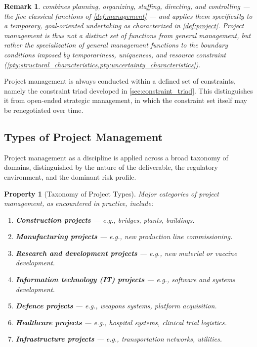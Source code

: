 \documentclass[12pt, a4paper]{report}
\theoremstyle{engnotes}
\newtheorem{property}{Property}[section]
\newtheorem{remark}{Remark}[section]
\begin{document}
\begin{remark}
     combines planning, organizing, staffing, directing, and controlling --- the five classical functions of \cref{def:management} --- and applies them specifically to a temporary, goal-oriented undertaking as characterized in \cref{def:project}. Project management is thus \emph{not} a distinct set of functions from general management, but rather the specialization of general management functions to the boundary conditions imposed by temporariness, uniqueness, and resource constraint (\cref{pty:structural_characteristics,pty:uncertainty_characteristics}).
\end{remark}

\begin{note}
    Project management is always conducted within a defined set of constraints, namely the constraint triad developed in \cref{sec:constraint_triad}. This distinguishes it from open-ended strategic management, in which the constraint set itself may be renegotiated over time.
\end{note}

\subsection{Types of Project Management}
\label{subsec:types_pm}

Project management as a discipline is applied across a broad taxonomy of domains, distinguished by the nature of the deliverable, the regulatory environment, and the dominant risk profile.

\begin{property}[Taxonomy of Project Types]\label{pty:taxonomy_project_types}
    Major categories of project management, as encountered in practice, include:
    \begin{enumerate}
        \item \textbf{Construction projects} --- e.g., bridges, plants, buildings.
        \item \textbf{Manufacturing projects} --- e.g., new production line commissioning.
        \item \textbf{Research and development projects} --- e.g., new material or vaccine development.
        \item \textbf{Information technology (IT) projects} --- e.g., software and systems development.
        \item \textbf{Defence projects} --- e.g., weapons systems, platform acquisition.
        \item \textbf{Healthcare projects} --- e.g., hospital systems, clinical trial logistics.
        \item \textbf{Infrastructure projects} --- e.g., transportation networks, utilities.
    \end{enumerate}
\end{property}
\end{document}
